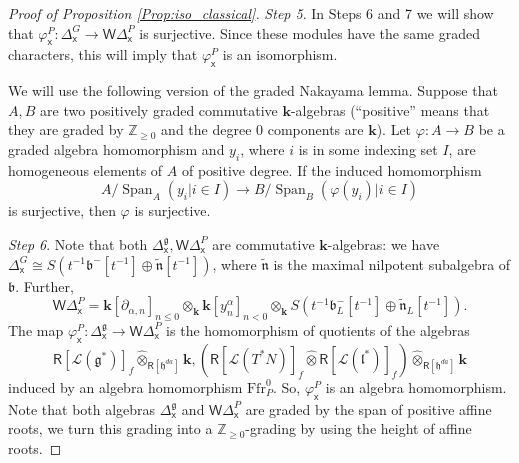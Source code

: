 \documentclass{amsart}
\theoremstyle{definition}
\newcommand{\Ring}{\mathsf{R}}
\newcommand{\g}{\mathfrak{g}}
\newcommand{\h}{\mathfrak{h}}
\newcommand{\Z}{\mathbb{Z}}
\newcommand{\lf}{\mathfrak{l}}
\newcommand{\Loop}{\mathscr{L}}
\newcommand{\bk}{\mathbf{k}}
\newcommand{\WakDelta}{\mathsf{W}\Delta}
\newcommand{\sx}{\mathsf{x}}
\newcommand{\Ffr}{\mathrm{{Ffr}}}
\numberwithin{equation}{section}
\begin{document}
\begin{proof}[Proof of Proposition \ref{Prop:iso_classical}]
{\it Step 5}. In Steps 6 and 7 we will show that $\varphi^P_{\sx}:\Delta^G_{\sx}\rightarrow \WakDelta^P_{\sx}$ is surjective. Since these modules have the same graded characters, this will imply that $\varphi^P_{\sx}$ is an isomorphism. 

We will use the following version of the graded Nakayama lemma. Suppose that $A,B$ are two positively graded commutative $\bk$-algebras (``positive'' means that they are graded by $\Z_{\geqslant 0}$ and the degree $0$ components are $\bk$). Let $\varphi:A\rightarrow B$ be a graded algebra homomorphism and $y_i$, where $i$ is in some indexing set $I$, are homogeneous elements of $A$ of positive degree. If the induced homomorphism $$A/\operatorname{Span}_A(y_i|i\in I)\rightarrow B/\operatorname{Span}_B(\varphi(y_i)|i\in I)$$ 
is surjective, then $\varphi$ is surjective. 

{\it Step 6}. Note that both $\Delta^\g_{\sx}, \WakDelta^P_{\sx}$ are commutative $\bk$-algebras: we have $\Delta^{G}_{\sx}\cong S(t^{-1}\mathfrak{b}^-[t^{-1}]\oplus\tilde{\mathfrak{n}}[t^{-1}])$, where $\tilde{\mathfrak{n}}$ is the maximal nilpotent subalgebra of $\mathfrak{b}$. Further, 
$$\WakDelta^P_{\sx}=\bk[\partial_{\alpha,n}]_{n\leqslant 0}\otimes_{\bk}\bk[y^\alpha_n]_{n< 0}\otimes_{\bk} S(t^{-1}\mathfrak{b}^-_L[t^{-1}]\oplus\tilde{\mathfrak{n}}_L[t^{-1}]).$$
The map $\varphi^P_{\sx}:\Delta^\g_{\sx}\rightarrow \WakDelta^P_{\sx}$ is the homomorphism of quotients of the algebras $$\Ring[\Loop (\g^*)]_f\widehat{\otimes}_{\Ring[\h^{da}]}\bk,
\left(\Ring[\Loop(T^*N)]_f\widehat{\otimes} \Ring[\Loop(\lf^*)]_f\right)\widehat{\otimes}_{\Ring[\h^{da}]}\bk$$ induced by an algebra homomorphism $\Ffr_P^0$. So, $\varphi^P_{\sx}$ is an algebra homomorphism. Note that both algebras $\Delta^\g_{\sx}$ and $\WakDelta^P_{\sx}$ are graded by the span of positive affine roots, we turn this grading into a $\Z_{\geqslant 0}$-grading by using the height of affine roots. 


\end{proof}
\end{document}
